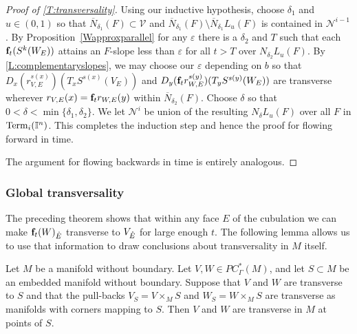 \begin{proof}[Proof of \cref{T:transversality}]
	Using our inductive hypothesis, choose $\delta_1$ and $u \in (0, 1)$ so that $\overline N_{\delta_1}(F) \subset \mathcal{V}$ and $\overline N_{\delta_1}(F) \setminus \overline N_{\delta_1} L_u(F)$ is contained in $\mathcal N^{i-1}$.
	By Proposition~\ref{Wapproxparallel} for any $\varepsilon$ there is a $\delta_2$ and $T$
	such that each $\mathbf{f}_t(S^k(W_E))$ attains an $F$-slope less than $\varepsilon$ for all $t>T$ over $N_{\delta_2} L_u(F)$.
	By \cref{L:complementaryslopes}, we may choose our $\varepsilon$ depending on $b$ so that $D_x(r^{s(x)}_{V,E})(T_xS^{s(x)}(V_E))$ and $D_y(\mathbf{f}_tr^{s(y)}_{W,E})(T_yS^{s(y)}(W_E))$ are transverse wherever $r_{V,E}(x) = \mathbf{f}_tr_{W,E}(y)$ within $\overline N_{\delta_2}(F)$.
	Choose $\delta$ so that $0 < \delta < \min\{\delta_1,\delta_2\}$.
	We let $\mathcal N^i$ be union of the resulting $N_{\delta} L_u(F)$ over all $F$ in ${\rm Term}_i(\mathbb{I}^n)$.
	This completes the induction step and hence the proof for flowing forward in time.

	The argument for flowing backwards in time is entirely analogous.
\end{proof}

\subsubsection{Global transversality}

The preceding theorem shows that within any face $E$ of the cubulation we can make $\mathbf{f}_t(W)_{\mathring{E}}$ transverse to $V_{\mathring{E}}$ for large enough $t$.
The following lemma allows us to use that information to draw conclusions about transversality in $M$ itself.

\begin{lemma}\label{L:local to global}
	Let $M$ be a manifold without boundary.
	Let $V, W \in PC^*_\Gamma(M)$, and let $S \subset M$ be an embedded manifold without boundary.
	Suppose that $V$ and $W$ are transverse to $S$ and that the pull-backs $V_S = V \times_M S$ and $W_S = W \times_M S$ are transverse as manifolds with corners mapping to $S$.
	Then $V$ and $W$ are transverse in $M$ at points of $S$.
\end{lemma}

